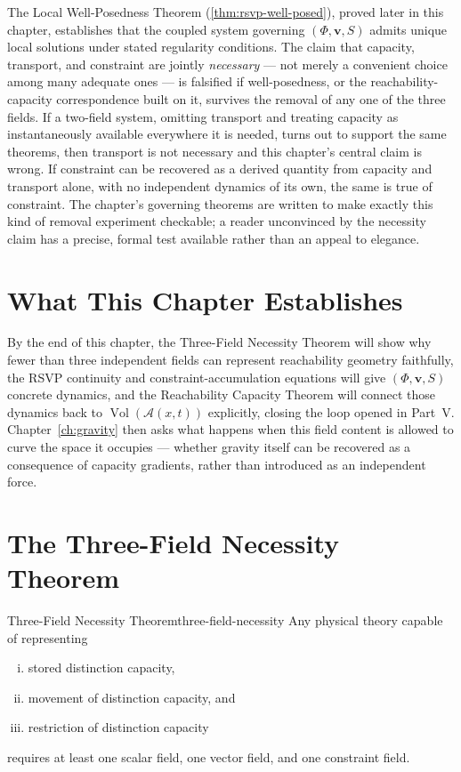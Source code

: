 \documentclass[12pt,twoside,openright]{book}
\newcommand{\adm}{\mathcal{A}}
\newcommand{\Vol}{\operatorname{Vol}}
\begin{document}
The Local Well-Posedness Theorem
(\cref{thm:rsvp-well-posed}), proved later in this chapter,
establishes that the coupled system governing
$(\Phi,\mathbf{v},S)$ admits unique local solutions under
stated regularity conditions. The claim that capacity,
transport, and constraint are jointly \emph{necessary} ---
not merely a convenient choice among many adequate ones --- is
falsified if well-posedness, or the reachability-capacity
correspondence built on it, survives the removal of any one
of the three fields. If a two-field system, omitting transport
and treating capacity as instantaneously available everywhere
it is needed, turns out to support the same theorems, then
transport is not necessary and this chapter's central claim is
wrong. If constraint can be recovered as a derived quantity
from capacity and transport alone, with no independent
dynamics of its own, the same is true of constraint. The
chapter's governing theorems are written to make exactly this
kind of removal experiment checkable; a reader unconvinced by
the necessity claim has a precise, formal test available
rather than an appeal to elegance.

\section{What This Chapter Establishes}
\label{sec:ch16-preview}

By the end of this chapter, the Three-Field Necessity Theorem
will show why fewer than three independent fields can
represent reachability geometry faithfully, the RSVP
continuity and constraint-accumulation equations will give
$(\Phi,\mathbf{v},S)$ concrete dynamics, and the Reachability
Capacity Theorem will connect those dynamics back to
$\Vol(\adm(x,t))$ explicitly, closing the loop opened in
Part~V. Chapter~\ref{ch:gravity} then asks what happens when
this field content is allowed to curve the space it occupies
--- whether gravity itself can be recovered as a consequence
of capacity gradients, rather than introduced as an
independent force.

\section{The Three-Field Necessity Theorem}
\label{sec:ch16-necessity}

\begin{theorem}{Three-Field Necessity Theorem}{three-field-necessity}
  Any physical theory capable of representing
  \begin{enumerate}[(i)]
    \item stored distinction capacity,
    \item movement of distinction capacity, and
    \item restriction of distinction capacity
  \end{enumerate}
  requires at least one scalar field, one vector field,
  and one constraint field.
\end{theorem}
\end{document}

